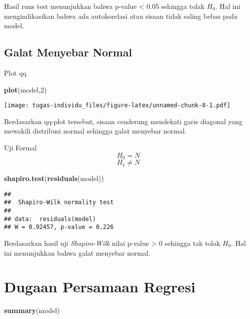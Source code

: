 \documentclass[
]{article}
\newenvironment{Shaded}{\begin{snugshade}}{\end{snugshade}}
\newcommand{\DecValTok}[1]{\textcolor[rgb]{0.00,0.00,0.81}{#1}}
\newcommand{\FunctionTok}[1]{\textcolor[rgb]{0.13,0.29,0.53}{\textbf{#1}}}
\newcommand{\NormalTok}[1]{#1}
\begin{document}
Hasil runs test menunjukkan bahwa p-value \textless{} 0.05 sehingga
tolak \(H_0\). Hal ini mengindikasikan bahwa ada autokorelasi atau
sisaan tidak saling bebas pada model.

\hypertarget{galat-menyebar-normal}{%
\subsection{Galat Menyebar Normal}\label{galat-menyebar-normal}}

Plot qq

\begin{Shaded}
\begin{Highlighting}[]
\FunctionTok{plot}\NormalTok{(model,}\DecValTok{2}\NormalTok{)}
\end{Highlighting}
\end{Shaded}

\texttt{[image: tugas-individu\_files/figure-latex/unnamed-chunk-8-1.pdf]}

Berdasarkan qq-plot tersebut, sisaan cenderung mendekati garis diagonal
yang mewakili distribusi normal sehingga galat menyebar normal.

Uji Formal \[H_0 = N\] \[H_1 \neq N\]

\begin{Shaded}
\begin{Highlighting}[]
\FunctionTok{shapiro.test}\NormalTok{(}\FunctionTok{residuals}\NormalTok{(model))}
\end{Highlighting}
\end{Shaded}

\begin{verbatim}
## 
##  Shapiro-Wilk normality test
## 
## data:  residuals(model)
## W = 0.92457, p-value = 0.226
\end{verbatim}

Berdasarkan hasil uji \emph{Shapiro-Wilk} nilai p-value \textgreater{} 0
sehingga tak tolak \(H_0\). Hal ini menunjukkan bahwa galat menyebar
normal.

\hypertarget{dugaan-persamaan-regresi}{%
\section{Dugaan Persamaan Regresi}\label{dugaan-persamaan-regresi}}

\begin{Shaded}
\begin{Highlighting}[]
\FunctionTok{summary}\NormalTok{(model)}
\end{Highlighting}
\end{Shaded}
\end{document}
